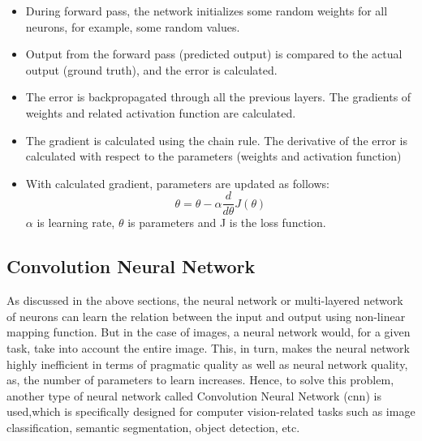 \begin{itemize}
    
    \item During forward pass, the network initializes some random weights for all neurons, for example, some random values.
    
    \item  Output from the forward pass (predicted output) is compared to the actual output (ground truth), and the error is calculated. 
    
    \item The error is backpropagated through all the previous layers. The gradients of weights and related activation function are calculated. 
    
    \item The gradient is calculated using the chain rule. The derivative of the error is calculated with respect to the parameters (weights and activation function)
    
    \item  With calculated gradient, parameters are updated as follows:
    \begin{equation}
        \theta =  \theta -  \alpha \frac {d}{d \theta}J( \theta)
    \end{equation}
    $\alpha$ is learning rate, $\theta$ is parameters and J is the loss function. 
\end{itemize}


\subsection{Convolution Neural Network}

As discussed in the above sections, the neural network or multi-layered network of neurons can learn the relation between the input and output using non-linear mapping function. But in the case of images, a neural network would, for a given task, take into account the entire image. This, in turn, makes the neural network highly inefficient in terms of pragmatic quality as well as neural network quality, as, the number of parameters to learn increases. Hence, to solve this problem, another type of neural network called Convolution Neural Network (\ac{cnn}) is used,which is specifically designed for computer vision-related tasks such as image classification, semantic segmentation, object detection, etc.  

\par

